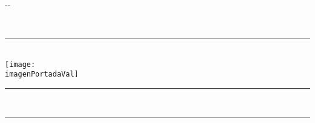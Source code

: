 {%
%
%
\newlength{\margenPortada}
\setlength{\margenPortada}{2.0cm}

\setlength{\cambioIzquierdo}{\cambioIzquierdo - \margenPortada}
\setlength{\cambioDerecho}{\cambioDerecho - \margenPortada}



\thispagestyle{empty}

\begin{cambiamargen}{-\cambioIzquierdo}{-\cambioDerecho}


\newlength{\evensidemarginOriginal}
\setlength{\evensidemarginOriginal}{\evensidemargin}

\newlength{\oddsidemarginOriginal}
\setlength{\oddsidemarginOriginal}{\oddsidemargin}

\setlength{\evensidemargin}{0cm}
\setlength{\oddsidemargin}{0cm}

\begin{huge}
	\begin{center}
		\textbf{\institucionVal}\\
	\end{center}
\end{huge}

\begin{center}
\rule{10.0cm}{.3mm}\\
\texttt{[image: \\imagenPortadaVal]}
\end{center}

\begin{huge}
\newlength{\longTitulo}
\begin{center}
	\rule{18cm}{.3mm}\\
	\textbf{\tituloPortadaVal}
	\rule{18cm}{.3mm}\\
\end{center}
\end{huge}


\end{cambiamargen}}
